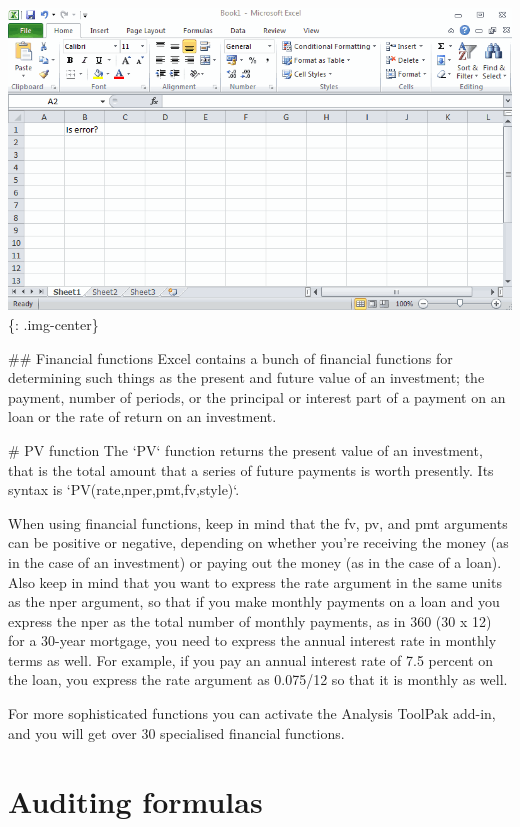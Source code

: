 \includegraphics[keepaspectratio,width=\textwidth,height=0.75\textheight]{img/example_function_iserror.gif}
\{: .img-center\}


## Financial functions
Excel contains a bunch of financial functions for determining such things as the present and future value of an investment; the payment, number of periods, or the principal or interest part of a payment on an loan or the rate of return on an investment.


# PV function
The `PV` function returns the present value of an investment, that is the total amount that a series of future payments is worth presently. Its syntax is `PV(rate,nper,pmt,fv,style)`.   

When using financial functions, keep in mind that the fv, pv, and pmt arguments can be positive or negative, depending on whether you’re receiving the money (as in the case of an investment) or paying out the money (as in the case of a loan). Also keep in mind that you want to express the rate argument in the same units as the nper argument, so that if you make monthly payments on a loan and you express the nper as the total number of monthly payments, as in 360 (30 x 12) for a 30-year mortgage, you need to express the annual interest rate in monthly terms as well. For example, if you pay an annual interest rate of 7.5 percent on the loan, you express the rate argument as 0.075/12 so that it is monthly as well.

For more sophisticated functions you can activate the Analysis ToolPak add-in, and you will get over 30 specialised financial functions. 


\chapter{Auditing formulas}
\label{auditingformulas}

